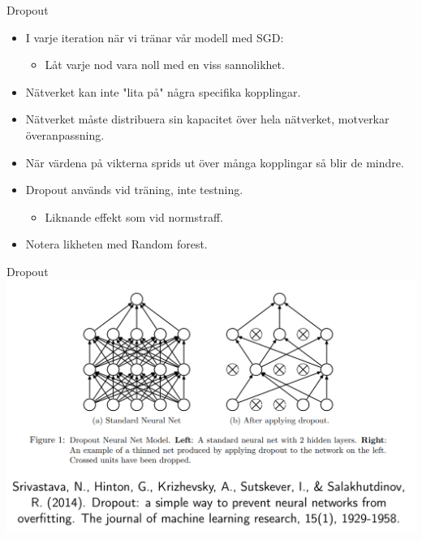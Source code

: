 \documentclass[10pt,english]{beamer}
\begin{document}
\begin{frame}{Dropout}

    \begin{itemize}
        \item I varje iteration när vi tränar vår modell med SGD:
        \begin{itemize}
            \item Låt varje nod vara noll med en viss sannolikhet.
        \end{itemize}
        \item Nätverket kan inte "lita på" några specifika kopplingar.
        \item Nätverket måste distribuera sin kapacitet över hela nätverket, motverkar överanpassning.
        \item När värdena på vikterna sprids ut över många kopplingar så blir de mindre.
        \item Dropout används vid träning, inte testning.
        \begin{itemize}
            \item Liknande effekt som vid normstraff.
        \end{itemize}
        \item Notera likheten med Random forest.
    \end{itemize}
    
\end{frame}

\begin{frame}{Dropout}
    \includegraphics[width=\textwidth]{figs/dropout_example.png}
\end{frame}
\end{document}
